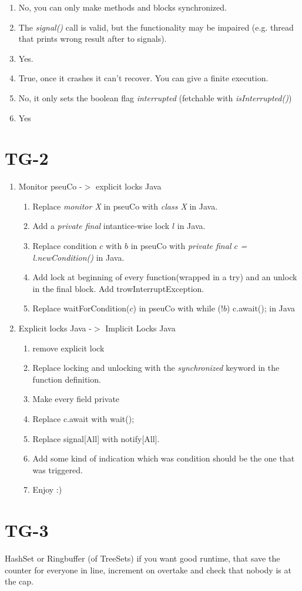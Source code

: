\documentclass[12pt]{article}
\begin{document}
\begin{enumerate}[label=(\alph*)]
        \item No, you can only make methods and blocks synchronized.
        \item The \textit{signal()} call is valid, but the functionality may be impaired (e.g. thread that prints wrong result after to signals).
        \item Yes.
        \item True, once it crashes it can't recover. You can give a finite execution.
        \item No, it only sets the boolean flag \textit{interrupted} (fetchable with \textit{isInterrupted()})
        \item Yes
    \end{enumerate}
    \section{TG-2}
    \begin{enumerate}
        \item Monitor pseuCo -$>$ explicit locks Java
        \begin{enumerate}[label=(\alph*)]
            \item Replace \textit{monitor X} in pseuCo with \textit{class X} in Java.
            \item Add a \textit{private final}  intantice-wise lock $l$ in Java.
            \item Replace condition $c$ with $b$ in pseuCo with \textit{private final $c$ = l.newCondition()} in Java.
            \item Add lock at beginning of every function(wrapped in a try) and an unlock in the final block. Add trowInterruptException.
            \item Replace waitForCondition($c$) in pseuCo with while ($!b$) c.await(); in Java
        \end{enumerate}
        \item Explicit locks Java -$>$ Implicit Locks Java
        \begin{enumerate}[label=(\alph*)]
            \item remove explicit lock
            \item Replace locking and unlocking with the \textit{synchronized} keyword in the function definition.
            \item Make every field private
            \item Replace c.await with wait();
            \item Replace signal[All] with notify[All].
            \item Add some kind of indication which was condition should be the one that was triggered.
            \item Enjoy :)
        \end{enumerate}
    \end{enumerate}

    \section{TG-3}
    HashSet or Ringbuffer (of TreeSets) if you want good runtime, that save the counter for everyone in line,
    increment on overtake and check that nobody is at the cap. 
\end{document}
